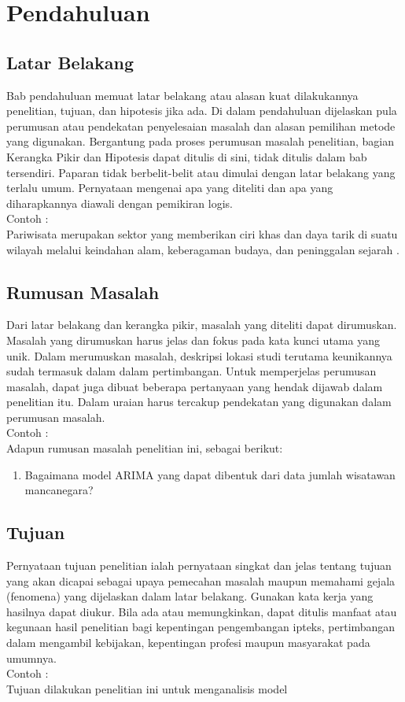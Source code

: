 \chapter{Pendahuluan}\label{Pendahuluan}

\pagestyle{plain}

\section{Latar Belakang}

Bab pendahuluan memuat latar belakang atau alasan kuat dilakukannya penelitian, tujuan, dan hipotesis jika ada. Di dalam pendahuluan dijelaskan pula perumusan atau pendekatan penyelesaian masalah dan alasan pemilihan metode yang digunakan. Bergantung pada proses perumusan masalah penelitian, bagian Kerangka Pikir dan Hipotesis dapat ditulis di sini, tidak ditulis dalam bab tersendiri.
Paparan tidak berbelit-belit atau dimulai dengan latar belakang yang terlalu umum. Pernyataan mengenai apa yang diteliti dan apa yang diharapkannya diawali dengan pemikiran logis. \\
 Contoh : \\
	Pariwisata merupakan sektor yang memberikan ciri khas dan daya tarik di suatu wilayah melalui keindahan alam, keberagaman budaya, dan peninggalan sejarah \cite{rahma2020potensi}. 
\section{Rumusan Masalah}
Dari latar belakang dan kerangka pikir, masalah yang diteliti dapat dirumuskan. Masalah yang dirumuskan harus jelas dan fokus pada kata kunci utama yang unik. Dalam merumuskan masalah, deskripsi lokasi studi terutama keunikannya sudah termasuk dalam dalam pertimbangan. Untuk memperjelas perumusan masalah, dapat juga dibuat beberapa pertanyaan yang hendak dijawab dalam penelitian itu. Dalam uraian harus tercakup pendekatan yang digunakan dalam perumusan masalah. \\
Contoh : \\
	Adapun rumusan masalah penelitian ini, sebagai berikut:
\begin{enumerate}
	\item Bagaimana model ARIMA yang dapat dibentuk dari data jumlah wisatawan mancanegara?
	
\end{enumerate}


\section{Tujuan}
Pernyataan tujuan penelitian ialah pernyataan singkat dan jelas tentang tujuan yang akan dicapai sebagai upaya pemecahan masalah maupun memahami gejala (fenomena) yang dijelaskan dalam latar belakang. Gunakan kata kerja yang hasilnya dapat diukur. Bila ada atau memungkinkan, dapat ditulis manfaat atau kegunaan hasil penelitian bagi kepentingan pengembangan ipteks, pertimbangan dalam mengambil kebijakan, kepentingan profesi maupun masyarakat pada umumnya. \\
Contoh : \\
Tujuan dilakukan penelitian ini untuk menganalisis model 